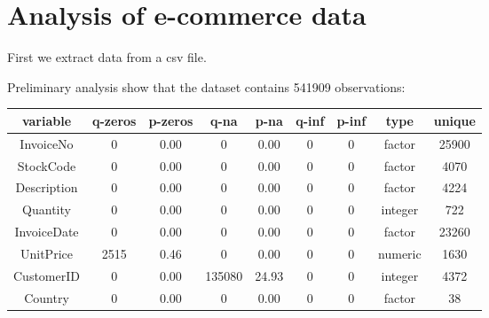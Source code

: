 \documentclass[12pt,a4paper,oneside,italian]{book}\usepackage[]{graphicx}\usepackage[]{color}
\begin{document}
\section*{Analysis of e-commerce data}




First we extract data from a csv file.





Preliminary analysis show that the dataset contains 541909 observations:
\begin{table}[!h]
\centering
\begin{tabular}{ccccccccc}
\toprule
variable & q-zeros & p-zeros & q-na & p-na & q-inf & p-inf & type & unique\\
\midrule
InvoiceNo & 0 & 0.00 & 0 & 0.00 & 0 & 0 & factor & 25900\\
StockCode & 0 & 0.00 & 0 & 0.00 & 0 & 0 & factor & 4070\\
Description & 0 & 0.00 & 0 & 0.00 & 0 & 0 & factor & 4224\\
Quantity & 0 & 0.00 & 0 & 0.00 & 0 & 0 & integer & 722\\
InvoiceDate & 0 & 0.00 & 0 & 0.00 & 0 & 0 & factor & 23260\\
UnitPrice & 2515 & 0.46 & 0 & 0.00 & 0 & 0 & numeric & 1630\\
CustomerID & 0 & 0.00 & 135080 & 24.93 & 0 & 0 & integer & 4372\\
Country & 0 & 0.00 & 0 & 0.00 & 0 & 0 & factor & 38\\
\bottomrule
\end{tabular}
\end{table}
\end{document}
